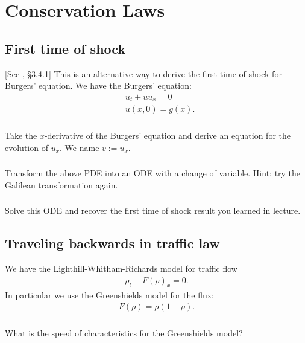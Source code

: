 \documentclass[11pt,letterpaper]{report}
\begin{document}
\chapter{Conservation Laws}
\section{First time of shock}
[See \cite{ShearerLevy_15}, \S3.4.1] This is an alternative way to derive the first time of shock for Burgers' equation. We have the Burgers' equation:
\begin{align}
    & u_t + uu_x = 0\label{eq:burgers}\\
    & u(x,0) = g(x).\nonumber
\end{align}

\subsection{}
Take the $x$-derivative of the Burgers' equation and derive an equation for the evolution of $u_x$. We name $v:= u_x$.

\subsection{}
Transform the above PDE into an ODE with a change of variable. Hint: try the Galilean transformation again.

\subsection{}
Solve this ODE and recover the first time of shock result you learned in lecture.

\section{Traveling backwards in traffic law}
We have the Lighthill-Whitham-Richards model for traffic flow
\begin{align}
    \rho_t + F(\rho)_x = 0.
\end{align}
In particular we use the Greenshields model for the flux:
\begin{align}
    F(\rho) = \rho(1-\rho).
\end{align}

\subsection{}
What is the speed of characteristics for the Greenshields model?
\end{document}
